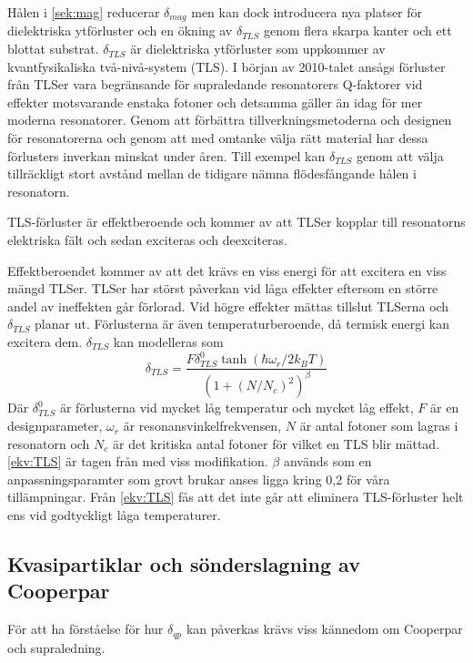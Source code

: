 \documentclass[main.tex]{subfiles}
\begin{document}
\label{sec:tls}
Hålen i \ref{sek:mag} reducerar $\delta_{mag}$ men kan dock introducera nya platser för dielektriska ytförluster och en ökning av $\delta_{TLS}$ genom flera skarpa kanter och ett blottat substrat\cite{Chiaro2016}. $\delta_{TLS}$ är dielektriska ytförluster som uppkommer av kvantfysikaliska två-nivå-system (TLS). I början av 2010-talet ansågs förluster från TLSer vara begränsande för supraledande resonatorers Q-faktorer vid effekter motsvarande enstaka fotoner\cite{Siddiqi2011} och detsamma gäller än idag för mer moderna resonatorer\cite{Boehme2016}\cite{Goetz2016}. Genom att förbättra tillverkningsmetoderna och designen för resonatorerna och genom att med omtanke välja rätt material har dessa förlusters inverkan minskat under åren\cite{Oliver2013}. Till exempel kan $\delta_{TLS}$ genom att välja tillräckligt stort avstånd mellan de tidigare nämna flödesfångande hålen i resonatorn\cite{Chiaro2016}.

TLS-förluster är effektberoende och kommer av att TLSer kopplar till resonatorns elektriska fält och sedan exciteras och deexciteras\cite{Boehme2016,Goetz2016}. 

Effektberoendet kommer av att det krävs en viss energi för att excitera en viss mängd TLSer. TLSer har störst påverkan vid låga effekter eftersom en större andel av ineffekten går förlorad. Vid högre effekter mättas tillslut TLSerna och $\delta_{TLS}$ planar ut. Förlusterna är även temperaturberoende, då termisk energi kan excitera dem. $\delta_{TLS}$ kan modelleras som
\begin{equation}
    \delta_{TLS}=\frac{F\delta_{TLS}^0\tanh{(\hbar\omega_r/2k_BT)}}{(1+(N/N_c)^2)^\beta}
    \label{ekv:TLS}
\end{equation}
Där $\delta_{TLS}^0$ är förlusterna vid mycket låg temperatur och mycket låg effekt, $F$ är en designparameter, $\omega_r$ är resonansvinkelfrekvensen, $N$ är antal fotoner som lagras i resonatorn och $N_c$ är det kritiska antal fotoner för vilket en TLS blir mättad. \ref{ekv:TLS} är tagen från\cite{pappas2011two} med viss modifikation. $\beta$ används som en anpassningsparamter som grovt brukar anses ligga kring 0,2\cite{faoro2012} för våra tillämpningar. Från \ref{ekv:TLS} fås att det inte går att eliminera TLS-förluster helt ens vid godtyckligt låga temperaturer\cite{Boehme2016}.

\subsection{Kvasipartiklar och sönderslagning av Cooperpar}
För att ha förståelse för hur $\delta_{qp}$ kan påverkas krävs viss kännedom om Cooperpar och supraledning.
\end{document}
